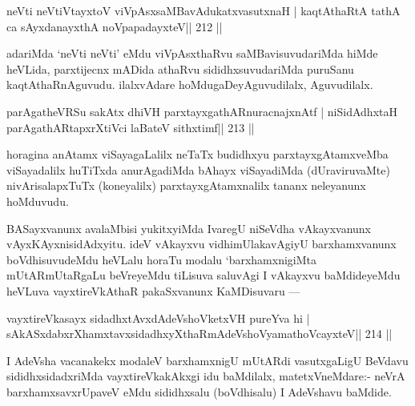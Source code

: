 
\begin{shl}
neVti neVtiVtayxtoV viVpAsxsaMBavAdukatxvasutxnaH |
kaqtAthaRtA tathA ca sAyxdanayxthA noVpapadayxteV\hfill || 212 ||
\end{shl}

\begin{artha}
adariMda `neVti neVti' eMdu viVpAsxthaRvu saMBavisuvudariMda hiMde heVLida, parxtijecnx mADida athaRvu sididhxsuvudariMda puruSanu kaqtAthaRnAguvudu. ilalxvAdare hoMdugaDeyAguvudilalx, Aguvudilalx.
\end{artha}


\begin{shl}
parAgatheVRSu sakAtx dhiVH parxtayxgathARnuracnajxnAtf |
niSidAdhx\s taH parAgathARtapxrXtiVci laBateV sithxtimf\hfill || 213 ||
\end{shl}

\begin{artha}
horagina anAtamx viSayagaLalilx neTaTx budidhxyu parxtayxgAtamxveMba
viSayadalilx huTiTxda anurAgadiMda bAhayx viSayadiMda (dUraviruvaMte)
nivArisalapxTuTx (koneyalilx) parxtayxgAtamxnalilx tananx neleyanunx hoMduvudu.
\end{artha}


\begin{artha}
BASayxvanunx avalaMbisi yukitxyiMda IvaregU niSeVdha
vAkayxvanunx vAyxKAyxnisidAdxyitu. ideV vAkayxvu vidhimUlakavAgiyU
barxhamxvanunx boVdhisuvudeMdu heVLalu horaTu modalu `barxhamxnigiMta
mUtARmUtaRgaLu beVreyeMdu tiLisuva saluvAgi I vAkayxvu baMdideyeMdu
heVLuva vayxtireVkAthaR pakaSxvanunx KaMDisuvaru  {\rm ---} 
\end{artha}

\begin{shl}
vayxtireVkasayx sidadhxtAvxdAdeVshoVketxVH pureYva hi |
sAkASxdabxrXhamxtavxsidadhxyXthaRmAdeVshoV\s yamathoVcayxteV\hfill || 214 ||
\end{shl}

\begin{artha}
I AdeVsha vacanakekx modaleV barxhamxnigU mUtARdi vasutxgaLigU BeVdavu sididhxsidadxriMda vayxtireVkakAkxgi idu baMdilalx, matetxVneMdare:- neVrA barxhamxsavxrUpaveV eMdu sididhxsalu (boVdhisalu) I AdeVshavu baMdide.
\end{artha}

